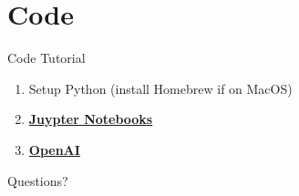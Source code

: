 \documentclass[10pt]{beamer}
\begin{document}
\section{Code}

\begin{frame}{Code Tutorial}
    \begin{enumerate}
        \item Setup Python (install Homebrew if on MacOS)
        \item \href{http://jupyter.org/install.html}{\textbf{Juypter Notebooks}}
        \item \href{https://gym.openai.com/docs}{\textbf{OpenAI}}
    \end{enumerate}
\end{frame}

\begin{frame}[standout]
  Questions?
\end{frame}

\appendix
\end{document}
